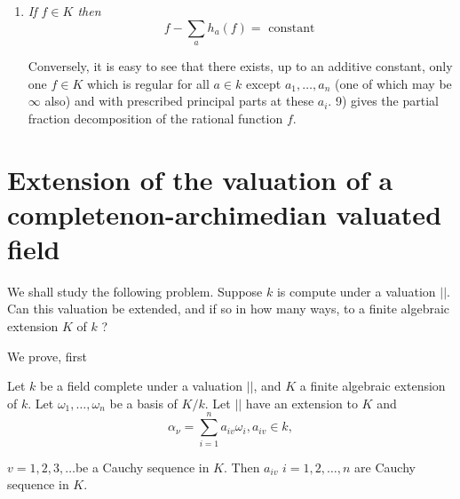 \begin{enumerate}[1)]
It is clear, then, that $\mho_a / \mathscr{Y}_a$ and
$\mho_\infty / \mathscr{Y}_\infty$ are both isomorphic to $k$
and since $K$ contains $k$, we may take $k$ itself as a set of
representatives of the residue class field. Any element $f$ in $K_a$
is uniquely of the form 
$$
f = \sum_{n = -t}^{\infty} a_n (x - a)^n ,
$$
$a_n \in k$. Similarly, if $\varphi \in K_\infty$,
$$
\varphi = \sum_{n =- t}^{\infty} b_n x^{-n}.
$$

As before, if we denote by $h_a (f)$ and $h_\infty(f)$ the principal
parts of $f \in K$ for the two valuations, then 
$$
\sum_a h_a(f) + h_\infty(f)
$$
has a meaning since $h_a(f) = 0$ for all but a finite number of
$\underbar{a}$ 

If\pageoriginale we define $\varphi \in K$ to be regular ar
$\underline{a} (\infty)$ if $\varphi \in \mho_a(\mho_{\infty})$, then
for $f \in K$,   
$$
f- \sum_a h_a (f)
$$
where $\underline{a}$ may be infinity also, is regular at all, $a \in
k$ and also for the valuation $||_\infty$. Such an element, clearly,
is a constant. Hence 

\item \textit{If $ f \in K $ then}
$$
f - \sum_a h _a (f) = \text{ constant }
$$

Conversely, it is easy to see that there exists, up to an additive
constant, only one $f \in K$ which is regular for all $a \in k$ except
$a_1, \ldots, a_n$ (one of which may be $\infty$  also) and with
prescribed principal parts at these $a_i$. 9) gives the partial
fraction decomposition of the rational function $f$.  
\end{enumerate}

\section[Extension of the valuation of a complete\ldots]{Extension of the valuation of a complete\hfill\break non-archimedian 
  valuated field}%

We shall study the following problem. Suppose $k$ is compute under a
valuation $||$. Can this valuation be extended, and if so in how many
ways, to a finite algebraic extension $K$ of $k$ ?   

We prove, first 

\setcounter{lem}{0}
\begin{lem} %
Let $k$ be a field complete under a valuation $||$, and $K$ a
  finite algebraic extension of $k$. Let $\omega _1 , \ldots ,
  \omega_n $ be a basis of $K/k$. Let $||$ have an extension to $K$
  and  
$$
\alpha _\nu = \sum_ { i = 1}^ n  a_{ i v} \omega_i, a_{iv}  \in k, 
$$

$v = 1 ,2, 3, \ldots$\pageoriginale  be a Cauchy sequence in $K$. Then 
  $a_{iv}$ $ i = 1, 2, \ldots , n $ are Cauchy sequence in $K$. 
\end{lem}

